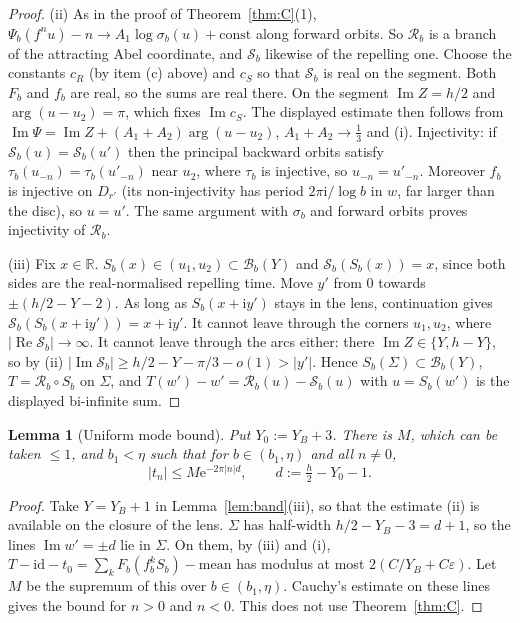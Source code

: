 \documentclass[11pt,a4paper]{article}
\newtheorem{lemma}[theorem]{Lemma}
\theoremstyle{definition}
\newcommand{\eee}{\mathrm{e}}
\newcommand{\ii}{\mathrm{i}}
\begin{document}
\begin{proof}
(ii) As in the proof of Theorem~\ref{thm:C}(1), $\Psi_b(f^nu)-n\to A_1\log\sigma_b(u)+\mathrm{const}$
along forward orbits.  So $\mathcal R_b$ is a branch of the attracting Abel
coordinate, and $\mathcal S_b$ likewise of the repelling one.  Choose the
constants $c_R$ (by item (c) above) and $c_S$ so that $\mathcal S_b$ is real on
the segment.  Both $F_b$ and $f_b$ are real, so the sums are real there.  On
the segment $\operatorname{Im}Z=h/2$ and $\arg(u-u_2)=\pi$, which fixes
$\operatorname{Im}c_S$.  The displayed estimate then follows from
$\operatorname{Im}\Psi=\operatorname{Im}Z+(A_1+A_2)\arg(u-u_2)$,
$A_1+A_2\to\tfrac13$ and (i).  Injectivity: if $\mathcal S_b(u)=\mathcal S_b(u')$
then the principal backward orbits satisfy
$\tau_b(u_{-n})=\tau_b(u'_{-n})$ near $u_2$, where $\tau_b$ is injective, so
$u_{-n}=u'_{-n}$.  Moreover $f_b$ is injective on $D_{r'}$ (its non-injectivity
has period $2\pi\ii/\log b$ in $w$, far larger than the disc), so $u=u'$.  The
same argument with $\sigma_b$ and forward orbits proves injectivity of
$\mathcal R_b$.

(iii) Fix $x\in\mathbb R$.  $S_b(x)\in(u_1,u_2)\subset\mathcal B_b(Y)$ and
$\mathcal S_b(S_b(x))=x$, since both sides are the real-normalised repelling
time.  Move $y'$ from $0$ towards $\pm(h/2-Y-2)$.  As long as $S_b(x+\ii y')$
stays in the lens, continuation gives $\mathcal S_b(S_b(x+\ii y'))=x+\ii y'$.
It cannot leave through the corners $u_1,u_2$, where
$|\operatorname{Re}\mathcal S_b|\to\infty$.  It cannot leave through the arcs
either: there $\operatorname{Im}Z\in\{Y,h-Y\}$, so by (ii)
$|\operatorname{Im}\mathcal S_b|\ge h/2-Y-\pi/3-o(1)>|y'|$.  Hence
$S_b(\Sigma)\subset\mathcal B_b(Y)$, $T=\mathcal R_b\circ S_b$ on $\Sigma$, and
$T(w')-w'=\mathcal R_b(u)-\mathcal S_b(u)$ with $u=S_b(w')$ is the displayed
bi-infinite sum.
\end{proof}

\begin{lemma}[Uniform mode bound]\label{lem:modes}
Put $Y_0:=Y_B+3$.  There is $M$, which can be taken $\le1$, and $b_1<\eta$ such
that for $b\in(b_1,\eta)$ and all $n\ne0$,
\[
 |t_n|\le M\eee^{-2\pi|n|d},\qquad d:=\tfrac h2-Y_0-1 .
\]
\end{lemma}

\begin{proof}
Take $Y=Y_B+1$ in Lemma~\ref{lem:band}(iii), so that the estimate (ii) is
available on the closure of the lens.  $\Sigma$ has half-width
$h/2-Y_B-3=d+1$, so the lines $\operatorname{Im}w'=\pm d$ lie in $\Sigma$.  On them, by (iii) and (i),
$T-\mathrm{id}-t_0=\sum_kF_b(f_b^kS_b)-\text{mean}$ has modulus at most $2(C/Y_B+C\varepsilon)$.  Let $M$ be the supremum of this over
$b\in(b_1,\eta)$.  Cauchy's estimate on these lines gives the bound
for $n>0$ and $n<0$.  This does not use Theorem~\ref{thm:C}.
\end{proof}
\end{document}
